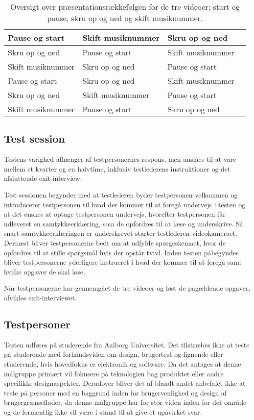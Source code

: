 %
\begin{table}[H]
	\centering
	\begin{tabular}{ | l | l | l | p{8cm} |}
		\hline
		Pause og start & Skift musiknummer & Skru op og ned \\ \hline
		Skru op og ned & Pause og start & Skift musiknummer\\ \hline
		Skift musiknummer & Skru op og ned & Pause og start \\ \hline
		Pause og start & Skru op og ned & Skift musiknummer\\ \hline
		Skru op og ned & Skift musiknummer & Pause og start\\ \hline
		Skift musiknummer & Pause og start & Skru op og ned \\ \hline
	\end{tabular}
	\caption{Oversigt over præsentationsrækkefølgen for de tre videoer; start og pause, skru op og ned og skift musiknummer.}
	\label{tab:PraesentationsraekkefoelgeValgAfGestikker}
\end{table}
\noindent
%




\subsection{Test session}
\label{TestSessionValgAfGestikker}
%
Testens varighed afhænger af testpersonernes respons, men anslåes til at vare mellem et kvarter og en halvtime, inklusiv testlederens instruktioner og det afsluttende exit-interview.

Test sessionen begynder med at testlederen byder testpersonen velkommen og introducerer testpersonen til hvad der kommer til at foregå undervejs i testen og at det ønskes at optage testpersonen undervejs, hvorefter testpersonen får udleveret en samtykkeerklæring, som de opfordres til at læse og underskrive. Så snart samtykkeerklæringen er underskrevet starter testlederen videokameraet. Dernæst bliver testpersonerne bedt om at udfylde spørgeskemaet, hvor de opfordres til at stille spørgsmål hvis der opstår tvivl. Inden testen påbegyndes bliver testpersonerne yderligere instrueret i hvad der kommer til at foregå samt hvilke opgaver de skal løse. 

Når testpersonerne har gennemgået de tre videoer og løst de pågældende opgaver, afvikles exit-interviewet. 
%

\subsection{Testpersoner}
\label{TestpersonerValgAfGestikker}
%
Testen udføres på studerende fra Aalborg Universitet. Det tilstræbes ikke at teste på studerende med forhåndsviden om design, brugertest og lignende eller studerende, hvis hovedfokus er elektronik og software. Da det antages at denne målgruppe primært vil fokusere på teknologien bag produktet eller andre specifikke designaspekter. Derudover bliver det af \textcite[s. 110]{Book:OUE} blandt andet anbefalet ikke at teste på personer med en baggrund inden for brugervenlighed og design af brugergrænseflader, da denne målgruppe har for stor viden inden for det område og de formentlig ikke vil være i stand til at give et upåvirket svar.

